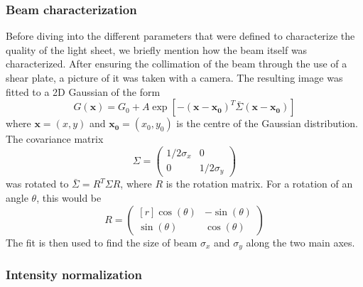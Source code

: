 \subsubsection{Beam characterization}
Before diving into the different parameters that were defined to characterize the quality of the light sheet, we briefly mention how the beam itself was characterized. After ensuring the collimation of the beam through the use of a shear plate, a picture of it was taken with a camera. The resulting image was fitted to a 2D Gaussian of the form
\begin{equation}
    G(\mathbf{x}) = G_0 + A \exp[-(\mathbf{x}-\mathbf{x_0})^T \bar{\Sigma} (\mathbf{x}-\mathbf{x_0})]
\end{equation}
where $\mathbf{x} = (x,y)$ and $\mathbf{x_0} = (x_0,y_0)$ is the centre of the Gaussian distribution. The covariance matrix
\begin{equation}
    \Sigma =
    \begin{pmatrix}
        1/2\sigma_x & 0           \\
        0           & 1/2\sigma_y
    \end{pmatrix}
\end{equation}
was rotated to $\bar{\Sigma} = R^T \Sigma R$, where $R$ is the rotation matrix. For a rotation of an angle $\theta$, this would be
\begin{equation}
    R = \begin{pmatrix*}[r]
        \cos(\theta) & -\sin(\theta) \\
        \sin(\theta) & \cos(\theta)
    \end{pmatrix*}
\end{equation}
The fit is then used to find the size of beam $\sigma_x$ and $\sigma_y$ along the two main axes.

\subsubsection{Intensity normalization}

